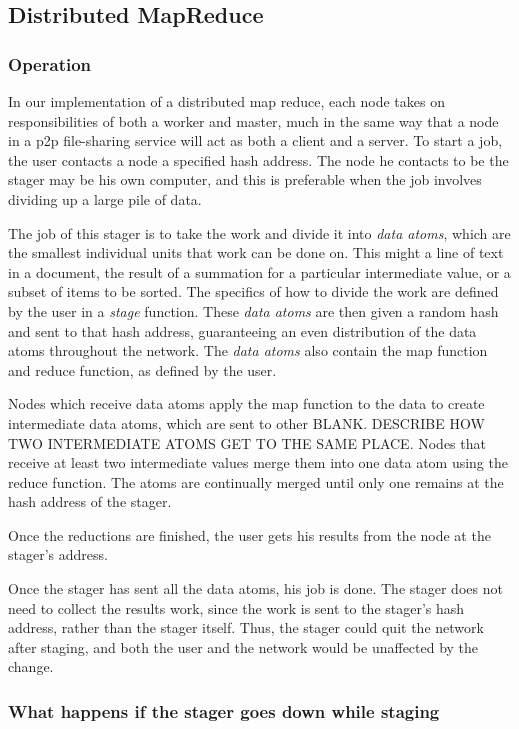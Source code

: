 \documentclass[conference, compsocconf, letterpaper]{IEEEtran}
\begin{document}
\subsection{Distributed MapReduce}

\subsubsection{Operation}
In our implementation of a distributed map reduce, each node takes on responsibilities of both a worker and master, much in the same way that a node in a p2p file-sharing service will act as both a client and a server.  To start a job, the user contacts a node a specified hash address. The node he contacts to be the stager may be his own computer, and this is preferable when the job involves dividing up a large pile of data. 

The job of this stager is to take the work and divide it into \emph{data atoms}, which are the smallest individual units that work can be done on.  This might a line of text in a document, the result of a summation for a particular intermediate value, or a subset of items to be sorted.  The specifics of how to divide the work are defined by the user in a \emph{stage} function.  These \emph{data atoms} are then given a random hash and sent to that hash address, guaranteeing an even distribution of the data atoms throughout the network.  The \emph{data atoms} also contain the map function and reduce function, as defined by the user.

Nodes which receive data atoms apply the map function to the data to create intermediate data atoms, which are sent to other BLANK.  DESCRIBE HOW TWO INTERMEDIATE ATOMS GET TO THE SAME PLACE.  Nodes that receive at least two intermediate values merge them into one data atom using the reduce function.   The atoms are continually merged until only one remains at the hash address of the stager. 

Once the reductions are finished, the user gets his results from the node at the stager's address.

Once the stager has sent all the data atoms, his job is done.  The stager does not need to collect the results work, since the work is sent to the stager's hash address, rather than the stager itself.  Thus, the stager could quit the network after staging, and both the user and the network would be unaffected by the change.



\subsubsection{What happens if the stager goes down while staging} 
\end{document}
